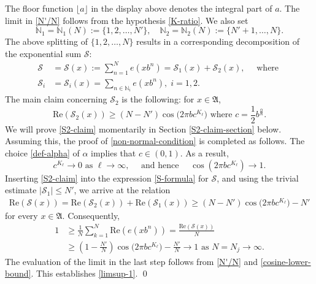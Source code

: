 \documentclass[12pt, twoside]{article}
\theoremstyle{definition}
\numberwithin{equation}{section}
\begin{document}
The floor function $\lfloor a \rfloor$ in the display above denotes the integral part of $a$. The limit in \eqref{N'/N} follows from the hypothesis \eqref{K-ratio}. We also set 
\begin{equation}   
\mathbb N_1 = \mathbb N_1(N) := \bigl\{1, 2, \ldots, N' \bigr\}, \quad \mathbb N_2 = \mathbb N_2(N) := \{N' + 1, \ldots, N\}.   
\end{equation} 
The above splitting of $\{1, 2, \ldots, N\}$ results in a corresponding 
decomposition of the exponential sum $\mathcal S$: 
\begin{align} \label{S-formula}
\mathcal S &= \mathcal S(x) := \sum_{n=1}^{N} e(xb^n) = \mathcal S_1(x) + \mathcal S_2(x), \quad \text{ where } \\ \mathcal S_i 
&= \mathcal S_i(x) = \sum_{n \in \mathbb N_i} e(xb^n), \; i=1,2. 
\end{align}   
The main claim concerning $\mathcal S_2$ is the following: for $x \in \mathfrak A$, 
\begin{equation} \label{S2-claim}
\text{Re}(\mathcal S_2(x)) \geq (N-N') \cos \bigl(2 \pi b c^{K_{\ell}} \bigr) \text{ where } c = \frac{1}{2} b^{\frac{\alpha}{\mathtt M}}.
\end{equation} 
We will prove \eqref{S2-claim} momentarily in Section \ref{S2-claim-section} below. Assuming this, the proof of \eqref{non-normal-condition} is completed as follows. The choice  \eqref{def-alpha} of $\alpha$ implies that $c \in (0,1)$. As a result, 
\begin{equation}  \label{cosine-lower-bound}   
c^{K_{\ell}} \rightarrow 0 \text{ as } \ell \rightarrow \infty, \quad \text{ and hence } \quad \cos(2 \pi b c^{K_{\ell}}) \rightarrow 1. 
\end{equation}  
Inserting \eqref{S2-claim} into the expression \eqref{S-formula} for $\mathcal S$, and using the trivial estimate $|\mathcal S_1| \leq N'$, we arrive at the relation
\begin{align*}
\text{Re}(\mathcal S(x)) = \text{Re}(\mathcal S_2(x)) + \text{Re}(\mathcal S_1(x)) \geq (N-N') \cos \bigl(2 \pi b c^{K_{\ell}} \bigr)  -  N'
\end{align*} 
for every $x \in \mathfrak A$. Consequently, 
\begin{align*} 
1 &\geq \frac{1}{N} \sum_{k=1}^{N} \text{Re}(e(xb^n)) = \frac{\text{Re}(\mathcal S(x))}{N} \\
&\geq \left(1 - \frac{N'}{N}\right) \cos \bigl(2 \pi b c^{K_{\ell}} \bigr)  - \frac{N'}{N} \rightarrow 1 \text{ as } N = N_j \rightarrow \infty.
\end{align*} 
The evaluation of the limit in the last step follows from \eqref{N'/N} and \eqref{cosine-lower-bound}. This establishes \eqref{limsup-1}.  
\qed
\end{document}

